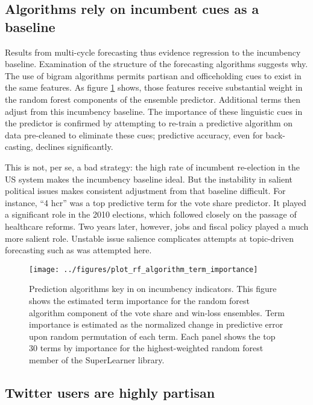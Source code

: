 \documentclass{acm_proc_article-sp}
\begin{document}
\subsection{Algorithms rely on incumbent cues as a baseline}
\label{sec:algor-behav-perf}

Results from multi-cycle forecasting thus evidence regression to
the incumbency baseline. Examination of the structure of the
forecasting algorithms suggests why. The use of
bigram algorithms permits partisan and officeholding cues to exist in
the same features. As figure \ref{fig:rf-term-importance} shows, those
features receive substantial weight in the random forest components of
the ensemble predictor. Additional terms then adjust from this incumbency baseline. The
importance of these linguistic cues in the predictor is confirmed by
attempting to re-train a predictive algorithm on data pre-cleaned to
eliminate these cues; predictive accuracy, even for back-casting,
declines significantly.

This is not, per se, a bad strategy: the high rate of incumbent
re-election in the US system makes the incumbency baseline ideal. But
the instability in salient political issues makes consistent
adjustment from that baseline difficult. For instance, ``4 hcr'' was a
top predictive term for the vote share predictor. It played a
significant role in the 2010 elections, which followed closely on the
passage of healthcare reforms. Two years later, however, jobs and
fiscal policy played a much more salient role. Unstable issue salience
complicates attempts at topic-driven forecasting such as was attempted
here. 

\begin{figure}[ht]
  \centering
  \texttt{[image: ../figures/plot\_rf\_algorithm\_term\_importance]}
  \caption{Prediction algorithms key in on incumbency
    indicators. This figure shows the estimated term importance for the random forest algorithm component
    of the vote share and win-loss ensembles. Term importance is
    estimated as the normalized change in predictive error upon
    random permutation of each term. Each panel shows the top
    30 terms by importance for the highest-weighted random forest
    member of the SuperLearner library.}
  \label{fig:rf-term-importance}
\end{figure}

\subsection{Twitter users are highly partisan}
\label{sec:part-cont-twitt}
\end{document}
